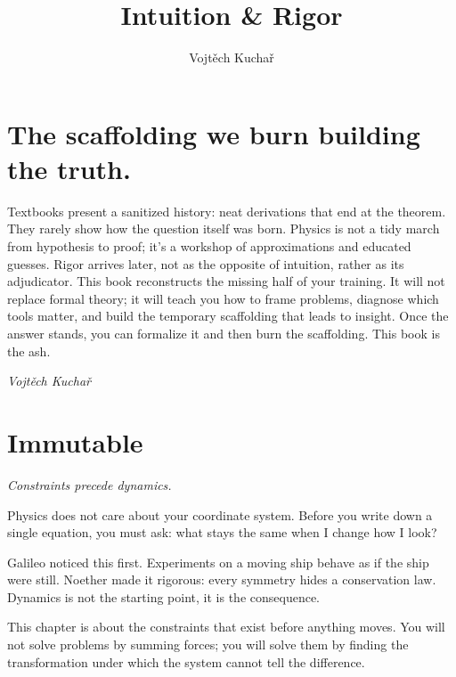 \documentclass{antiquebook}
\author{Vojtěch Kuchař}
\title{{Intuition \& Rigor}}
\begin{document}
	\frontmatter
	\maketitle
	\tableofcontents
	\mainmatter
	\pagestyle{fancy}

\chapter*{The scaffolding we burn building the truth.}
{}
Textbooks present a sanitized history: neat derivations that end at the theorem. They rarely show how the question itself was born. Physics is not a tidy march from hypothesis to proof; it’s a workshop of approximations and educated guesses. Rigor arrives later, not as the opposite of intuition, rather as its adjudicator. This book reconstructs the missing half of your training. It will not replace formal theory; it will teach you how to frame problems, diagnose which tools matter, and build the temporary scaffolding that leads to insight. Once the answer stands, you can formalize it and then burn the scaffolding. This book is the ash.\par\vspace{1em}
{\hfill\raggedright \itshape Vojtěch Kuchař}
\newpage\chapter{Immutable}
\begin{center}
    \vspace{-2em}
{\itshape Constraints precede dynamics.}
\end{center}
\vspace{2em}
Physics does not care about your coordinate system. Before you write down a single equation, you must ask: what stays the same when I change how I look?

Galileo noticed this first. Experiments on a moving ship behave as if the ship were still. Noether made it rigorous: every symmetry hides a conservation law. Dynamics is not the starting point, it is the consequence.

This chapter is about the constraints that exist before anything moves. You will not solve problems by summing forces; you will solve them by finding the transformation under which the system cannot tell the difference.\vspace{1em}
\end{document}
